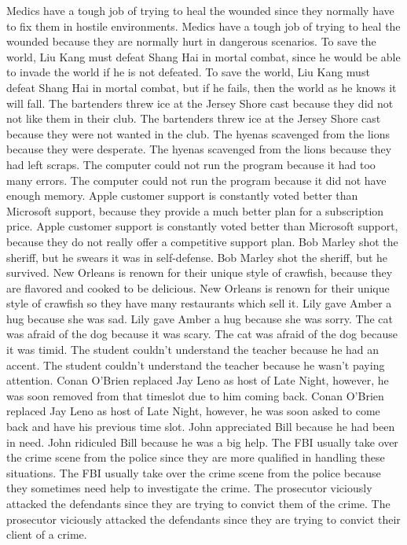 \documentclass{article}
\begin{document}
\begin{enumerate}
Medics have a tough job of trying to heal the wounded since they normally have to fix them in hostile environments.
Medics have a tough job of trying to heal the wounded because they are normally hurt in dangerous scenarios.
To save the world, Liu Kang must defeat Shang Hai in mortal combat, since he would be able to invade the world if he is not defeated.
To save the world, Liu Kang must defeat Shang Hai in mortal combat, but if he fails, then the world as he knows it will fall.
The bartenders threw ice at the Jersey Shore cast because they did not not like them in their club.
The bartenders threw ice at the Jersey Shore cast because they were not wanted in the club.
The hyenas scavenged from the lions because they were desperate.
The hyenas scavenged from the lions because they had left scraps.
The computer could not run the program because it had too many errors.
The computer could not run the program because it did not have enough memory.
Apple customer support is constantly voted better than Microsoft support, because they provide a much better plan for a subscription price.
Apple customer support is constantly voted better than Microsoft support, because they do not really offer a competitive support plan.
Bob Marley shot the sheriff, but he swears it was in self-defense.
Bob Marley shot the sheriff, but he survived.
New Orleans is renown for their unique style of crawfish, because they are flavored and cooked to be delicious.
New Orleans is renown for their unique style of crawfish so they have many restaurants which sell it.
Lily gave Amber a hug because she was sad.
Lily gave Amber a hug because she was sorry.
The cat was afraid of the dog because it was scary.
The cat was afraid of the dog because it was timid.
The student couldn't understand the teacher because he had an accent.
The student couldn't understand the teacher because he wasn't paying attention.
Conan O'Brien replaced Jay Leno as host of Late Night, however, he was soon removed from that timeslot due to him coming back.
Conan O'Brien replaced Jay Leno as host of Late Night, however, he was soon asked to come back and have his previous time slot.
John appreciated Bill because he had been in need.
John ridiculed Bill because he was a big help.
The FBI usually take over the crime scene from the police since they are more qualified in handling these situations.
The FBI usually take over the crime scene from the police because they sometimes need help to investigate the crime.
The prosecutor viciously attacked the defendants since they are trying to convict them of the crime.
The prosecutor viciously attacked the defendants since they are trying to convict their client of a crime.

\end{enumerate}
\end{document}
